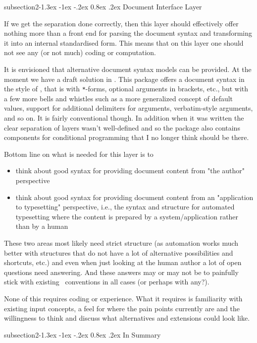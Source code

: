 \documentclass{ltnews}
\makeatletter
\renewcommand{\@subheadingfont}{%
   \sffamily\slshape
   \let\LaTeX\cmssLaTeX\let\TeX\cmssTeX
}
\renewcommand{\subsection}{%
   \@startsection
      {subsection}{2}{\z@}{-1.3ex \@plus -1ex \@minus -.2ex}%
      {0.8ex \@plus.2ex}{\@subheadingfont}%
}
\makeatother
\begin{document}
\subsection{Document Interface Layer}

If we get the separation done correctly, then this layer should effectively offer nothing more than a front end for parsing the document syntax and transforming it into an internal standardised form. This means that on this layer one should not see any (or not much) coding or computation.

It is envisioned that alternative document syntax models can be provided.
At the moment we have a draft solution in .
This package offers a document syntax in the style of \LaTeXe, that is with \verb|*|-forms, optional arguments in brackets, etc., but with a few more bells and whistles such as a more generalized concept of default values, support for additional delimiters for arguments, verbatim-style arguments, and so on.
It is fairly conventional though.
In addition when it was written the clear separation of layers wasn't well-defined and so the package also contains components for conditional programming that I no longer think should be there.

Bottom line on what is needed for this layer is to
\begin{itemize}
\item think about good syntax for providing document content from "the author" perspective
\item think about good syntax for providing document content from an "application to typesetting" perspective, i.e., the syntax and structure for automated typesetting where the content is prepared by a system/application rather than by a human
\end{itemize}
These two areas most likely need strict structure (as automation works much better with structures that do not have a lot of alternative possibilities and shortcuts, etc.) and even when just looking at the human author a lot of open questions need answering.
And these answers may or may not be to painfully stick with existing \LaTeXe\ conventions in all cases (or perhaps with any?).

None of this requires coding or  experience. What it requires is familiarity with existing input concepts, a feel for where the pain points currently are and the willingness to think and discuss what alternatives and extensions could look like.

\subsection{In Summary}
\end{document}
